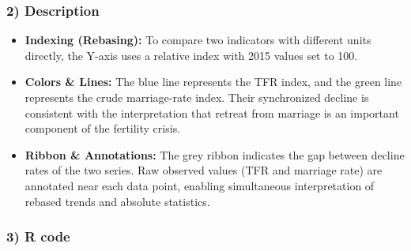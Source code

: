 \documentclass[12pt,letterpaper]{article}
\begin{document}
\subsubsection*{2) Description}
\begin{itemize}
  \item \textbf{Indexing (Rebasing):} To compare two indicators with different units directly, the Y-axis uses a relative index with 2015 values set to 100.
  \item \textbf{Colors \& Lines:} The blue line represents the TFR index, and the green line represents the crude marriage-rate index. Their synchronized decline is consistent with the interpretation that retreat from marriage is an important component of the fertility crisis.
  \item \textbf{Ribbon \& Annotations:} The grey ribbon indicates the gap between decline rates of the two series. Raw observed values (TFR and marriage rate) are annotated near each data point, enabling simultaneous interpretation of rebased trends and absolute statistics.
\end{itemize}
	
	\subsubsection*{3) R code}
	\inputminted[firstline=212, lastline=270, breaklines=true, fontsize=\footnotesize, bgcolor=backcolour]{r}{finalproject_SK.R}
	
	
	
\end{document}
